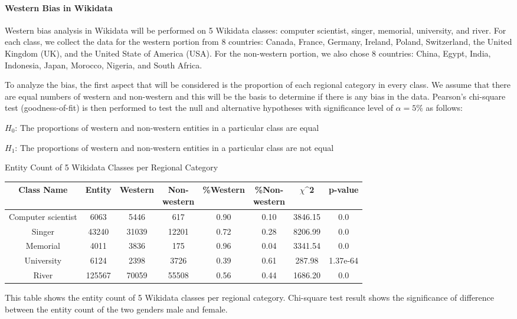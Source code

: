 \paragraph{Western Bias in Wikidata}

Western bias analysis in Wikidata will be performed on 5 Wikidata classes: computer scientist, singer, memorial, university, and river. For each class, we collect the data for the western portion from 8 countries: Canada, France, Germany, Ireland, Poland, Switzerland, the United Kingdom (UK), and the United State of America (USA). For the non-western portion, we also chose 8 countries: China, Egypt, India, Indonesia, Japan, Morocco, Nigeria, and South Africa.

To analyze the bias, the first aspect that will be considered is the proportion of each regional category in every class. We assume that there are equal numbers of western and non-western and this will be the basis to determine if there is any bias in the data. Pearson's chi-square test (goodness-of-fit) is then performed to test the null and alternative hypotheses with significance level of \(\alpha=5\%\) as follows:

\(H_0\): The proportions of western and non-western entities in a particular class are equal

\(H_1\): The proportions of western and non-western entities in a particular class are not equal


\begin{center}
\small
\begin{threeparttable}
\caption{Entity Count of 5 Wikidata Classes per Regional Category}
\label{tab:western - entity count}
\begin{tabular}{c c c c c c c c} 

\toprule
    Class Name & Entity & Western & \CellWithForceBreak{Non- \\ western} & \%Western & \CellWithForceBreak{\%Non- \\ western}& $\chi$^2 & p-value \\ [0.5ex] 
\midrule
    Computer scientist & 6063 & 5446 & 617 & 0.90 & 0.10 & 3846.15 & 0.0 \\
    Singer & 43240 & 31039 & 12201 & 0.72 & 0.28 & 8206.99 & 0.0 \\
    Memorial & 4011 & 3836 & 175 & 0.96 & 0.04 & 3341.54 & 0.0 \\
    University & 6124 & 2398 & 3726 & 0.39 & 0.61 & 287.98 & 1.37e-64 \\
    River & 125567 & 70059 & 55508 & 0.56 & 0.44 & 1686.20 & 0.0 \\
    [1ex]
\bottomrule
\end{tabular}
\begin{tablenotes}
    \footnotesize
    This table shows the entity count of 5 Wikidata classes per regional category. Chi-square test result shows the significance of difference between the entity count of the two genders male and female.
\end{tablenotes}
\end{threeparttable}
\end{center}

